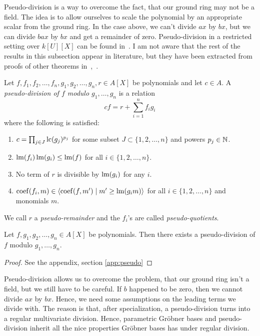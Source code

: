 Pseudo-division is a way to overcome the fact, that our ground ring may not be a field. The idea is to allow ourselves to scale the polynomial by an appropriate scalar from the ground ring. In the case above, we can't divide $ax$ by $bx$, but we can divide $bax$ by $bx$ and get a remainder of zero. Pseudo-division in a restricted setting over $k[U][X]$ can be found in~\cite{IVA}. I am not aware that the rest of the results in this subsection appear in literature, but they have been extracted from proofs of other theorems in~\cite{grb_covers},~\cite{MONTES20101391}.

\begin{definition}
  Let $f, f_{1}, f_{2}, \dots, f_{n}, g_{1}, g_{2}, \dots, g_{n}, r \in A[X]$ be polynomials and let $c \in A$. A \textit{pseudo-division of $f$ modulo $g_{1}, \dots, g_{n}$} is a relation
  \[cf = r + \sum_{i=1}^{n} f_{i}g_{i}\]
  where the following is satisfied:
  \begin{enumerate}
    \item $c = \prod_{j\in J} \operatorname{lc}(g_{j})^{p_{j}}$ for some subset $J \subset \{1, 2, \dots, n\}$ and powers $p_{j} \in \mathbb{N}$.
    \item $\operatorname{lm}(f_{i})\operatorname{lm}(g_{i}) \leq \operatorname{lm}(f)$ for all $i \in \{1, 2, \dots, n\}$.
    \item No term of $r$ is divisible by $\operatorname{lm}(g_{i})$ for any $i$.
    \item $\operatorname{coef}(f_{i}, m) \in \langle \operatorname{coef}(f, m') \mid m' \geq \operatorname{lm}(g_{i}m) \rangle$ for all $i \in \{1, 2, \dots, n\}$ and monomials $m$.
  \end{enumerate}
  We call $r$ a \textit{pseudo-remainder} and the $f_{i}$'s are called \textit{pseudo-quotients}.
\end{definition}


\begin{theorem}\label{thm:exi_pseudo}
  Let $f, g_{1}, g_{2}, \dots, g_{n} \in A[X]$ be polynomials. Then there exists a pseudo-division of $f$ modulo $g_{1}, \dots, g_{n}$.
\end{theorem}
\begin{proof}
  See the appendix, section \ref{app:pseudo}
\end{proof}

Pseudo-division allows us to overcome the problem, that our ground ring isn't a field, but we still have to be careful. If $b$ happened to be zero, then we cannot divide $ax$ by $bx$. Hence, we need some assumptions on the leading terms we divide with. The reason is that, after specialization, a pseudo-division turns into a regular multivariate division. Hence, parametric Gröbner bases and pseudo-division inherit all the nice properties Gröbner bases has under regular division.

